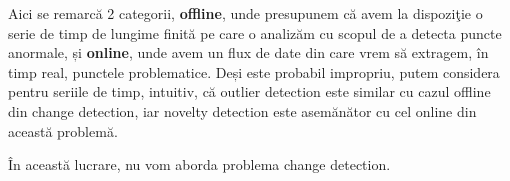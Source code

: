 Aici se remarcă 2 categorii, \textbf{offline}, 
unde presupunem că avem la dispoziţie 
o serie de timp de lungime finită pe care o analizăm cu scopul de a 
detecta puncte anormale, și \textbf{online}, unde avem un flux de date din 
care vrem să extragem, în timp real, punctele problematice. Deși este probabil 
impropriu, putem considera pentru seriile de timp, intuitiv, că outlier detection este similar 
cu cazul offline din change detection, iar novelty detection este asemănător 
cu cel online din această problemă.

În această lucrare, nu vom aborda problema change detection.